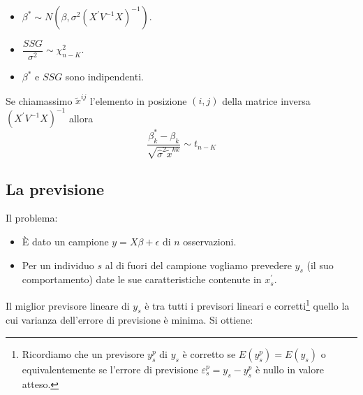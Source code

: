 \documentclass[a4paper]{report}
\theoremstyle{remark}
\begin{document}
\begin{itemize}
\item $\beta ^{\ast }\sim N(\beta ,\sigma ^{2}(X^{\prime }V^{-1}X)^{-1})$.

\item $\dfrac{SSG}{\sigma ^{2}}\sim \chi _{n-K}^{2}$.

\item $\beta ^{\ast }$ e $SSG$ sono indipendenti.
\end{itemize}

\noindent Se chiamassimo $\tilde{x}^{ij}$ l'elemento in posizione $(i,j)$
della matrice inversa $(X^{\prime }V^{-1}X)^{-1}$ allora 
\begin{equation}
\dfrac{\beta _{k}^{\ast }-\beta _{k}}{\sqrt{\hat{\sigma}^{2}\tilde{x}^{kk}}}%
\sim t_{n-K}
\end{equation}

\subsection{La previsione}

Il problema:

\begin{itemize}
\item \`{E} dato un campione $y=X\beta +\epsilon $ di $n$ osservazioni.

\item Per un individuo $s$ al di fuori del campione vogliamo prevedere $%
y_{s} $ (il suo comportamento) date le sue caratteristiche contenute in $%
x_{s}^{\prime }$.
\end{itemize}

\noindent Il miglior previsore lineare di $y_{s}$ \`{e} tra tutti i
previsori lineari e corretti\footnote{%
Ricordiamo che un previsore $y_{s}^{p}$ di $y_{s}$ \`{e} corretto se $%
E(y_{s}^{p})=E(y_{s})$ o equivalentemente se l'errore di previsione $%
\varepsilon _{s}^{p}=y_{s}-y_{s}^{p}$ \`{e} nullo in valore atteso.} quello
la cui varianza dell'errore di previsione \`{e} minima. Si ottiene:
\end{document}
